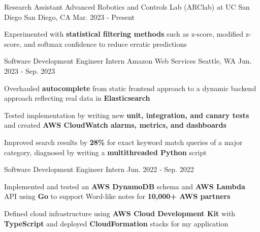 

\begin{cventries}
  \cventry
    {Research Assistant}
    {Advanced Robotics and Controls Lab (ARClab) at UC San Diego}
    {San Diego, CA}
    {Mar. 2023 - Present}
    {
      \begin{cvitems}
        \item {Experimented with \textbf{statistical filtering methods} such as z-score, modified z-score, and softmax confidence to reduce erratic predictions} 
      \end{cvitems}
    }

  \cvtwoentry
    {Software Development Engineer Intern} %
    {Amazon Web Services} %
    {Seattle, WA} %
    {Jun. 2023 - Sep. 2023}
    {
      \begin{cvitems}
        \item {Overhauled \textbf{autocomplete} from static frontend approach to a dynamic backend approach reflecting real data in \textbf{Elasticsearch}}
        \item {Tested implementation by writing new \textbf{unit, integration, and canary tests} and created \textbf{AWS CloudWatch alarms, metrics, and dashboards}}
        \item {Improved search results by \textbf{28\%} for exact keyword match queries of a major category, diagnosed by writing a \textbf{multithreaded Python} script}
      \end{cvitems}
    }
    {Software Development Engineer Intern}
    {Jun. 2022 - Sep. 2022} %
    {
      \begin{cvitems} %
        \item {Implemented and tested an \textbf{AWS DynamoDB} schema and \textbf{AWS Lambda} API using \textbf{Go} to support Word-like notes for \textbf{10,000+ AWS partners} }
        \item {Defined cloud infrastructure using \textbf{AWS Cloud Development Kit} with \textbf{TypeScript} and deployed \textbf{CloudFormation} stacks for my application}
      \end{cvitems}
    }


\end{cventries}
